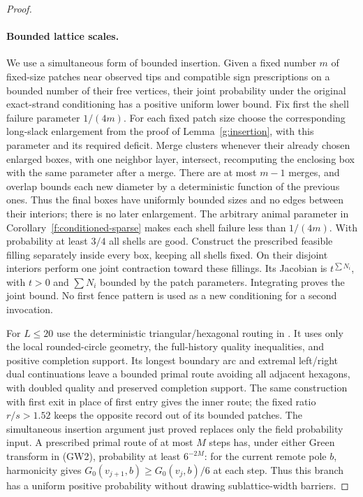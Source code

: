 \begin{proof}
\paragraph{Bounded lattice scales.}
We use a simultaneous form of bounded insertion.  Given a fixed number
\(m\) of fixed-size patches near observed tips and compatible sign
prescriptions on a bounded number of their free vertices, their joint
probability under the original exact-strand conditioning has a positive
uniform lower bound.  Fix first the shell failure parameter \(1/(4m)\).
For each fixed patch size choose the corresponding long-slack enlargement
from the proof of Lemma~\ref{g:insertion}, with this parameter and its
required deficit.  Merge clusters whenever their already chosen enlarged
boxes, with one neighbor layer, intersect, recomputing the enclosing box
with the same parameter after a merge.  There are at most \(m-1\) merges,
and overlap bounds each new diameter by a deterministic function of the
previous ones.  Thus the final boxes have uniformly bounded sizes and no
edges between their interiors; there is no later enlargement.  The arbitrary
animal parameter in Corollary~\ref{f:conditioned-sparse} makes each shell
failure less than \(1/(4m)\).  With probability at least \(3/4\) all
shells are good.  Construct the prescribed feasible filling separately
inside every box, keeping all shells fixed.  On their disjoint interiors
perform one joint contraction toward these fillings.  Its Jacobian is
\(t^{\sum N_i}\), with \(t>0\) and \(\sum N_i\) bounded by the patch
parameters.  Integrating proves the joint bound.  No first fence pattern
is used as a new conditioning for a second invocation.

For \(L\le20\) use the deterministic triangular/hexagonal routing in
\cite[proof of Lemma~3.15, pp.~65--66]{SSdiscrete}.  It uses only the
local rounded-circle geometry, the full-history quality inequalities,
and positive completion support.  Its longest boundary arc and extremal
left/right dual continuations leave a bounded primal route avoiding all
adjacent hexagons, with doubled quality and preserved completion support.
The same construction with first exit in place of first entry gives the
inner route; the fixed ratio \(r/s>1.52\) keeps the opposite record out
of its bounded patches.  The simultaneous insertion argument just proved
replaces only the field probability input.  A prescribed primal route of
at most \(M\) steps has, under either Green transform in (GW2), probability
at least \(6^{-2M}\): for the current remote pole \(b\), harmonicity gives
\(G_0(v_{j+1},b)\ge G_0(v_j,b)/6\) at each step.  Thus this branch has a uniform
positive probability without drawing sublattice-width barriers.


\end{proof}
